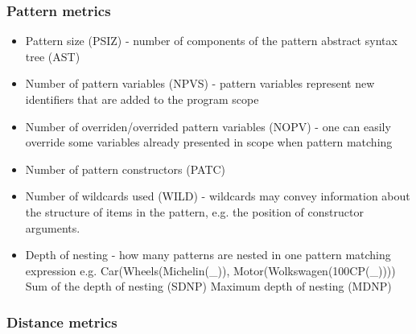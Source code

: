 \documentclass{article}
\begin{document}
\subsubsection{Pattern metrics}
\begin{itemize}
\item Pattern size (PSIZ) - number of components of the pattern abstract syntax tree (AST)
\item Number of pattern variables (NPVS) - pattern variables represent new identifiers that are added to the program scope
\item Number of overriden/overrided pattern variables (NOPV) - one can easily override some variables already presented in scope when pattern matching
\item Number of pattern constructors (PATC) 
\item Number of wildcards used (WILD) -  wildcards may convey information about the structure of items in the pattern, e.g. the position of constructor arguments.
\item Depth of nesting - how many patterns are nested in one pattern matching expression e.g. Car(Wheels(Michelin(\_)), Motor(Wolkswagen(100CP(\_))))
\subitem Sum of the depth of nesting (SDNP)
\subitem Maximum depth of nesting (MDNP)
\end{itemize}

\subsubsection{Distance metrics}
\end{document}

